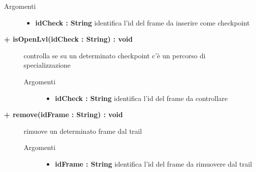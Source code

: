 \begin{description}
\begin{description}
		\begin{description}
			\item[Argomenti] \hfill
				\begin{itemize}
				
					\item \textbf{idCheck : String			} \hfill
						identifica l'id del frame da inserire come checkpoint
					
				\end{itemize}
		\end{description}
	\end{description}
	
	\begin{description}
		\item[\textbf{\color{blue}+ isOpenLvl(idCheck : String) : void			}] \hfill
			controlla se su un determinato checkpoint c'è un percorso di specializzazione
			
		\begin{description}
			\item[Argomenti] \hfill
				\begin{itemize}
				
					\item \textbf{idCheck : String			} \hfill
						identifica l'id del frame da controllare
					
				\end{itemize}
		\end{description}
	\end{description}
	
		
	
	\begin{description}
		\item[\textbf{\color{blue}+ remove(idFrame : String) : void			}] \hfill
			rimuove un determinato frame dal trail
			
		\begin{description}
			\item[Argomenti] \hfill
				\begin{itemize}
				
					\item \textbf{idFrame : String			} \hfill
						identifica l'id del frame da rimuovere dal trail
					
				\end{itemize}
		\end{description}
	\end{description}
	

\end{description}
